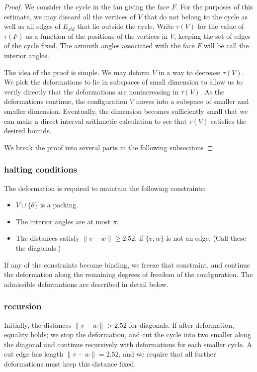 \begin{proof}  We consider the cycle in the fan
giving the face $F$.  For the purposes of this
estimate, we may discard all the vertices of $V$
that do not belong to the cycle as well as all edges
of $E_{std}$ that lie outside the cycle.
Write $\tau(V)$ for the value of $\tau(F)$ as a
function of the positions of the vertices in $V$,
keeping the set of edges of the cycle fixed.  The
azimuth angles associated with the face $F$ will be
call the interior angles.  

The idea of the proof is simple.  We may deform $V$ in a way to decrease $\tau(V)$.  We pick the deformations to lie in subspaces of small dimension to allow us to verify directly that the deformations are nonincreasing in $\tau(V)$.  As the deformations continue, the configuration $V$ moves into a subspace of smaller and smaller dimension.  Eventually, the dimension becomes sufficiently small that we can make a direct interval arithmetic calculation to see that $\tau(V)$ satisfies the desired bounds.

We break the proof into several parts in the following
subsections
\end{proof}


\subsubsection{halting conditions}

The deformation is required to maintain the following
constraints:
\begin{itemize}
\item $V\cup\{\theta\}$ is a packing.
\item The interior angles are at most $\pi$.
\item The distances satisfy $\|v-w\|\ge 2.52$, if $\{v,w\}$ is
not an edge.  (Call these the diagonals.)
\end{itemize}
If any of the constraints become binding, we freeze that
constraint, and continue the deformation along the remaining degrees of freedom of the configuration.  The admissible deformations are described in detail below.

\subsubsection{recursion}

Initially, the distances $\|v-w\|>2.52$ for diagonals.
If after deformation, equality holds; we stop the deformation, and cut the cycle into two smaller along the diagonal
and continue recursively with deformations for each smaller cycle.  A cut edge has length $\|v-w\|=2.52$, and
we require that all further deformations must keep this distance fixed.  

